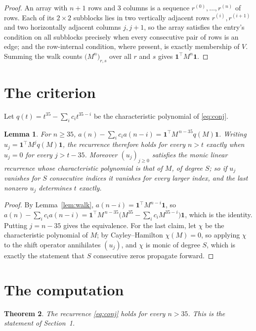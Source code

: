 \documentclass[11pt,a4paper]{article}
\theoremstyle{plain}
\newtheorem{theorem}{Theorem}
\newtheorem{lemma}[theorem]{Lemma}
\theoremstyle{definition}
\begin{document}
\begin{proof}
An array with $n+1$ rows and $3$ columns is a sequence $r^{(0)},\dots,r^{(n)}$ of
rows. Each of its $2\times2$ subblocks lies in two vertically adjacent rows
$r^{(i)},r^{(i+1)}$ and two horizontally adjacent columns $j,j+1$, so the array satisfies
the entry's condition on all subblocks precisely when every consecutive pair of rows is an
edge; and the row-internal condition, where present, is exactly membership of $V$. Summing
the walk counts $\bigl(M^{n}\bigr)_{r,s}$ over all $r$ and $s$ gives
$\mathbf{1}^{\!\top}M^{n}\mathbf{1}$.
\end{proof}

\section{The criterion}

Let $q(t)=t^{35}-\sum_i c_i t^{35-i}$ be the characteristic polynomial of
\eqref{eq:conj}.

\begin{lemma}\label{lem:crit}
For $n\ge35$,
$a(n)-\sum_i c_i a(n-i)=\mathbf{1}^{\!\top}M^{\,n-35}q(M)\mathbf{1}$. Writing
$u_j=\mathbf{1}^{\!\top}M^{j}q(M)\mathbf{1}$, the recurrence therefore holds for every
$n>t$ exactly when $u_j=0$ for every $j>t-35$. Moreover $(u_j)_{j\ge0}$ satisfies the
monic linear recurrence whose characteristic polynomial is that of $M$, of degree $S$; so
if $u_j$ vanishes for $S$ consecutive indices it vanishes for every larger index, and the
last nonzero $u_j$ determines $t$ exactly.
\end{lemma}

\begin{proof}
By Lemma~\ref{lem:walk}, $a(n-i)=\mathbf{1}^{\!\top}M^{n-i}\mathbf{1}$, so
$a(n)-\sum_i c_i a(n-i)
=\mathbf{1}^{\!\top}M^{\,n-35}\bigl(M^{35}-\sum_i c_i M^{35-i}\bigr)
\mathbf{1}$, which is the identity. Putting $j=n-35$ gives the equivalence. For the
last claim, let $\chi$ be the characteristic polynomial of $M$; by Cayley--Hamilton
$\chi(M)=0$, so applying $\chi$ to the shift operator annihilates $(u_j)$, and $\chi$ is
monic of degree $S$, which is exactly the statement that $S$ consecutive zeros propagate
forward.
\end{proof}

\section{The computation}

\begin{theorem}
The recurrence \eqref{eq:conj} holds for every $n>35$. This is the statement of
Section~1.
\end{theorem}
\end{document}
